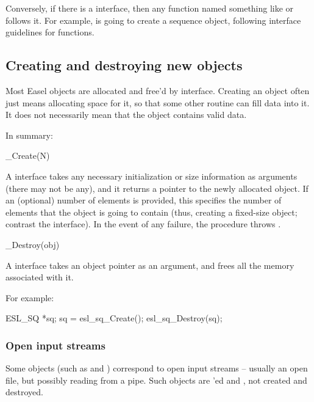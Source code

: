 Conversely, if there is a  interface, then any
function named something like  or
 follows it. For example,
 is going to create a 
sequence object, following interface guidelines for 
functions.

\subsection{Creating and destroying new objects}

Most Easel objects are allocated and free'd by
 interface. Creating an object often
just means allocating space for it, so that some other routine can
fill data into it. It does not necessarily mean that the object
contains valid data.

In summary:

\begin{sreapi}
\hypertarget{ifc:Create} 
{\item[\_Create(N)]}

A  interface takes any necessary initialization or
size information as arguments (there may not be any), and it returns a
pointer to the newly allocated object. If an (optional) number of
elements  is provided, this specifies the number of elements
that the object is going to contain (thus, creating a fixed-size
object; contrast the  interface).  In the
event of any failure, the procedure throws .

\hypertarget{ifc:Destroy} 
{\item[\_Destroy(obj)]}
A  interface takes an object pointer as an
argument, and frees all the memory associated with it.
\end{sreapi}

For example:
\begin{cchunk}
   ESL_SQ *sq;
   sq = esl_sq_Create();
   esl_sq_Destroy(sq);
\end{cchunk}



\subsubsection{Open input streams}

Some objects (such as  and )
correspond to open input streams -- usually an open file, but possibly
reading from a pipe. Such objects are 'ed and
, not created and destroyed.

